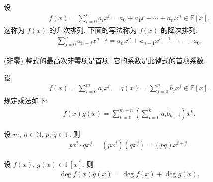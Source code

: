 \begin{definition}
    设
    \begin{align*}
        f(x) = \sum_{i=0}^n a_i x^i = a_0 + a_1 x + \cdots + a_n x^n \in \mathbb{F}[x].
    \end{align*}
    这称为 $f(x)$ 的升次排列. 下面的写法称为 $f(x)$ 的降次排列:
    \begin{align*}
        \sum_{j=0}^{n} a_{n-j} x^{n-j} = a_n x^n + a_{n-1} x^{n-1} + \cdots + a_0.
    \end{align*}

    (非零) 整式的最高次非零项是首项. 它的系数是此整式的首项系数.
\end{definition}

\begin{definition}
    设
    \begin{align*}
        f(x) = \sum_{i=0}^m a_i x^i, \quad g(x) = \sum_{j=0}^n b_j x^j \in \mathbb{F}[x].
    \end{align*}
    规定乘法如下:
    \begin{align*}
        f(x) g(x) = \sum_{k=0}^{m+n} \left( \sum_{i=0}^k a_i b_{k-i} \right) x^k.
    \end{align*}
\end{definition}

\begin{proposition}
    设 $m$, $n \in \mathbb{N}$, $p$, $q \in \mathbb{F}$. 则
    \begin{align*}
        px^i \cdot qx^j = (px^i) (qx^j) = (pq)x^{i + j}.
    \end{align*}
\end{proposition}

\begin{proposition}
    设 $f(x)$, $g(x) \in \mathbb{F}[x]$. 则
    \begin{align*}
        \deg f(x) g(x) = \deg f(x) + \deg g(x).
    \end{align*}
\end{proposition}

